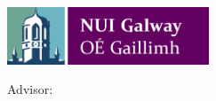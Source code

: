 \pagestyle{empty}
\begin{center}

\centerline{\mbox{\includegraphics[width=60mm]{assets/Logo_NUIG.pdf}}}

\bigskip

{\large \ThesisUniversity}

{\ThesisDept}

\vfill

{\bfseries\Huge \ThesisTitle}

\medskip

{\Large \ThesisType}

\vspace{2cm}

{\bfseries\large \ThesisAuthor}

\medskip

{\large Advisor: \ThesisAdvisor}

\vspace{2cm}

{\large \ThesisPurpose}

\medskip

{\large \ThesisDegree}

\vspace{2cm}

{\bfseries\monthyear\ThesisDate}

\end{center}

\cleardoublepage

\setcounter{page}{1}

\pagestyle{fancy}
